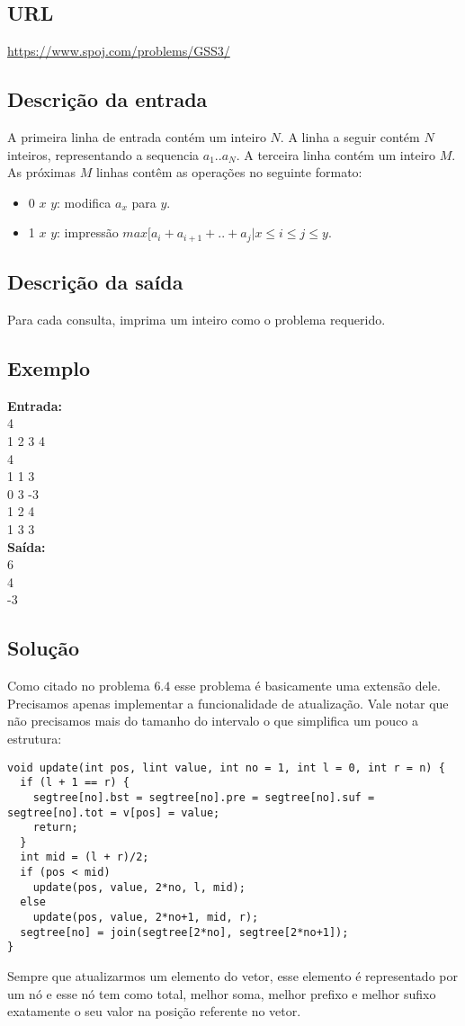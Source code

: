\subsection{URL}
\url{https://www.spoj.com/problems/GSS3/}

\subsection{Descrição da entrada}
A primeira linha de entrada contém um inteiro $N$. A linha a seguir contém $N$ inteiros, representando a sequencia $a_1$..$a_N$.
A terceira linha contém um inteiro $M$. As próximas $M$ linhas contêm as operações no seguinte formato:
\begin{itemize}
    \item 0 $x$ $y$: modifica $a_x$ para $y$.
    \item 1 $x$ $y$: impressão $max{[a_i + a_{i + 1} + .. + a_j | x \leq i \leq j \leq y}$.
\end{itemize}

\subsection{Descrição da saída}
Para cada consulta, imprima um inteiro como o problema requerido.
\subsection{Exemplo}
\textbf{Entrada:} \\
4 \\
1 2 3 4 \\
4 \\
1 1 3 \\
0 3 -3 \\
1 2 4 \\
1 3 3 \\

\textbf{Saída:} \\
6 \\
4 \\
-3 \\

\subsection{Solução}
Como citado no problema $6.4$ esse problema é basicamente uma extensão dele. Precisamos apenas implementar a funcionalidade de atualização. Vale notar que não precisamos mais do tamanho do intervalo o que simplifica um pouco a estrutura:
\begin{lstlisting}
void update(int pos, lint value, int no = 1, int l = 0, int r = n) {
  if (l + 1 == r) {
    segtree[no].bst = segtree[no].pre = segtree[no].suf = segtree[no].tot = v[pos] = value;
    return;
  }
  int mid = (l + r)/2;
  if (pos < mid)
    update(pos, value, 2*no, l, mid);
  else
    update(pos, value, 2*no+1, mid, r);
  segtree[no] = join(segtree[2*no], segtree[2*no+1]);
}
\end{lstlisting}
Sempre que atualizarmos um elemento do vetor, esse elemento é representado por um nó e esse nó tem como total, melhor soma, melhor prefixo e melhor sufixo exatamente o seu valor na posição referente no vetor.

